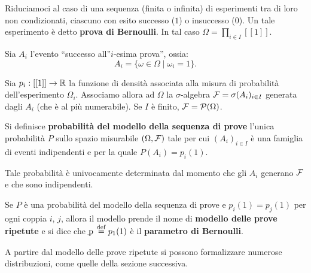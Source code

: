 \begin{multicols*}{2}
    Riduciamoci al caso di una sequenza (finita o infinita) di esperimenti tra di
    loro non condizionati, ciascuno
    con esito successo ($1$) o insuccesso ($0$). Un tale esperimento è
    detto \textbf{prova di Bernoulli}. In tal caso $\Omega = \prod_{i \in I} [[1]]$. \medskip
    
    
    Sia $A_i$ l'evento ``successo all''$i$-esima prova'', ossia:
    \[
        A_i = \{ \omega \in \Omega \mid \omega_i = 1 \}.
    \]

    Sia $p_i : [[1]] \to \mathbb{R}$ la funzione di densità associata alla misura
    di probabilità dell'esperimento $\Omega_i$. Associamo allora ad $\Omega$ la $\sigma$-algebra $\mathcal{F} = \sigma(A_i)_{i \in I}$ generata
    dagli $A_i$ (che è al più numerabile). Se $I$ è finito, $\mathcal{F} = \mathcal{P}(\Omega)$.

    \begin{definition}
        Si definisce \textbf{probabilità del modello della sequenza di prove}
        l'unica probabilità $P$ sullo spazio misurabile $(\Omega, \mathcal{F})$ tale
        per cui $(A_i)_{i \in I}$ è una famiglia di eventi indipendenti e
        per la quale $P(A_i) = p_i(1)$.
    \end{definition}

    \begin{remark}
        Tale probabilità è univocamente determinata dal momento che
        gli $A_i$ generano $\mathcal{F}$ e che sono indipendenti.
    \end{remark}

    \begin{definition}
        Se $P$ è una probabilità del modello della sequenza di prove e
        $p_i(1) = p_j(1)$ per ogni coppia $i$, $j$, allora il modello
        prende il nome di \textbf{modello delle prove ripetute} e si dice
        che $\pbern \defeq p_1(1)$ è il \textbf{parametro di Bernoulli}.
    \end{definition}

    A partire dal modello delle prove ripetute si possono formalizzare
    numerose distribuzioni, come quelle della sezione successiva.
\end{multicols*}